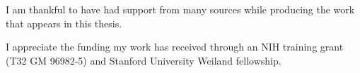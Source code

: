 
I am thankful to have had support from many sources while producing the work
that appears in this thesis.

I appreciate the funding my work has received through an NIH training grant (T32
GM 96982-5) and Stanford University Weiland fellowship.
